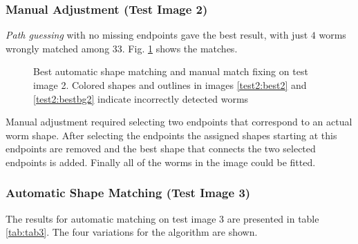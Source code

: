 \subsubsection*{Manual Adjustment (Test Image 2)}

\emph{Path guessing} with no missing endpoints gave the best result,
with just $4$ worms wrongly matched among $33$. Fig. \ref{fig:best2} shows the matches.

\begin{figure}[h]
  \centering
\qquad
\qquad
\qquad

\caption[Best automatic shape matching and manual match fixing on test image 2]{Best automatic shape matching and manual match fixing on test image 2. Colored shapes and outlines in images
    \ref{test2:best2} and \ref{test2:bestbg2} indicate incorrectly detected worms}
\label{fig:best2}
\end{figure}

Manual adjustment required selecting two endpoints that correspond to an actual worm shape. After selecting the
endpoints the assigned shapes starting at this endpoints are removed
and the best shape that connects the two selected endpoints is added.
Finally all of the worms in the image could be fitted.


\subsubsection*{Automatic Shape Matching (Test Image 3)}

The results for automatic matching on test image
3 are presented in table \ref{tab:tab3}. The four variations for the algorithm are shown.

